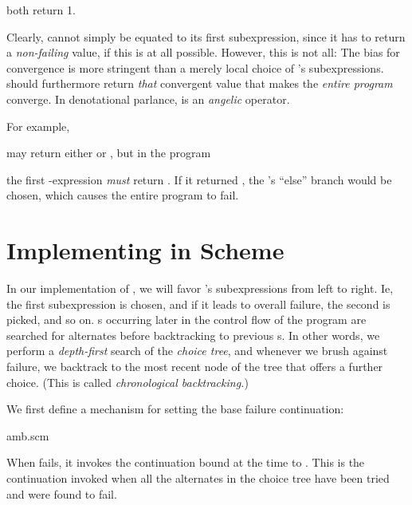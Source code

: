 
\n both return 1.

Clearly,  cannot simply be equated to its first
subexpression, since it has to return a {\em non-failing}
value, if this is at all possible.  However, this is not
all: The bias for convergence is more stringent than a
merely local choice of 's subexpressions.  
should furthermore return {\em that} convergent value
that makes the {\em entire program} converge.  In
denotational parlance,  is an {\em angelic}
operator.

For example,


\n may return either  or , but in the program


\n the first -expression {\em must} return .
If it returned , the 's ``else'' branch would be
chosen, which causes the entire program to fail.

\section{Implementing  in Scheme}  

In our implementation of , we will favor
's subexpressions from left to right.  Ie, the
first subexpression is chosen, and if it leads to overall
failure, the second is picked, and so on.  s occurring
later in the control flow of the program are searched for
alternates before backtracking to previous s.  In
other words, we perform a {\em depth-first} search of the
 {\em choice tree}, and whenever we brush against
failure, we backtrack to the most recent node of the tree
that offers a further choice.  (This is called {\em
chronological backtracking.})

We first define a mechanism for setting the base failure
continuation:

\scmfilename amb.scm

\n When  fails, it invokes the continuation bound at
the time to .  This is the continuation invoked
when all the alternates in the  choice tree have been
tried and were found to fail.


